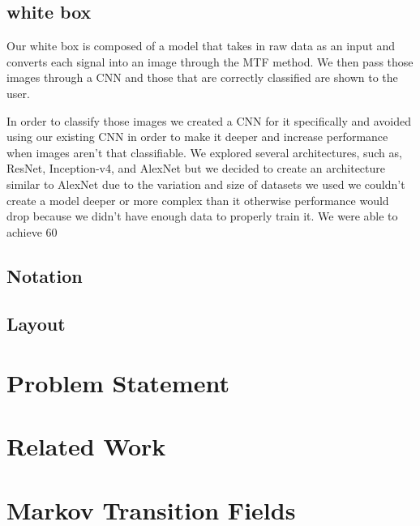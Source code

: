 \documentclass{turabian-thesis}
\begin{document}
\section{white box}
Our white box is composed of a model that takes in raw data as an input and converts each signal into an image through the MTF method. We then pass those images through a CNN and those that are correctly classified are shown to the user.

In order to classify those images we created a CNN for it specifically and avoided using our existing CNN in order to make it deeper and increase performance when images aren’t that classifiable. We explored several architectures, such as, ResNet, Inception-v4, and AlexNet but we decided to create an architecture similar to AlexNet due to the variation and size of datasets we used we couldn’t create a model deeper or more complex than it otherwise performance would drop because we didn’t have enough data to properly train it. We were able to achieve 60%

\section{Notation}

\section{Layout}

\chapter{Problem Statement}


\chapter{Related Work}
 

\chapter{Markov Transition Fields}
\end{document}
